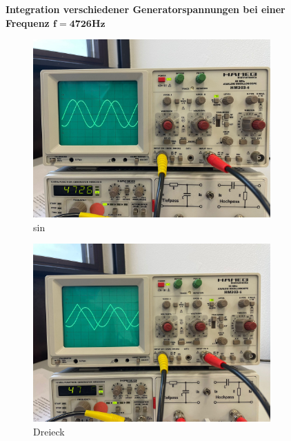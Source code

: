 \begin{figure}[H]  
  \centering
  \textbf{Integration verschiedener Generatorspannungen bei einer Frequenz $\symbf{f = 4726\unit{\hertz}}$}\par\medskip
  \begin{subfigure}{0.48\textwidth}
    \centering
    \includegraphics[scale=0.1]{content/sinInt.png}
    \caption{sin}
    \label{subfig:sin}
  \end{subfigure}
  \hfill
  \begin{subfigure}{0.48\textwidth}
    \centering
    \includegraphics[scale=0.1]{content/saegInt.png}
    \caption{Dreieck}
    \label{subfig:Saege}
  \end{subfigure}
  \caption{}
  \label{fig:abb9}
\end{figure}

